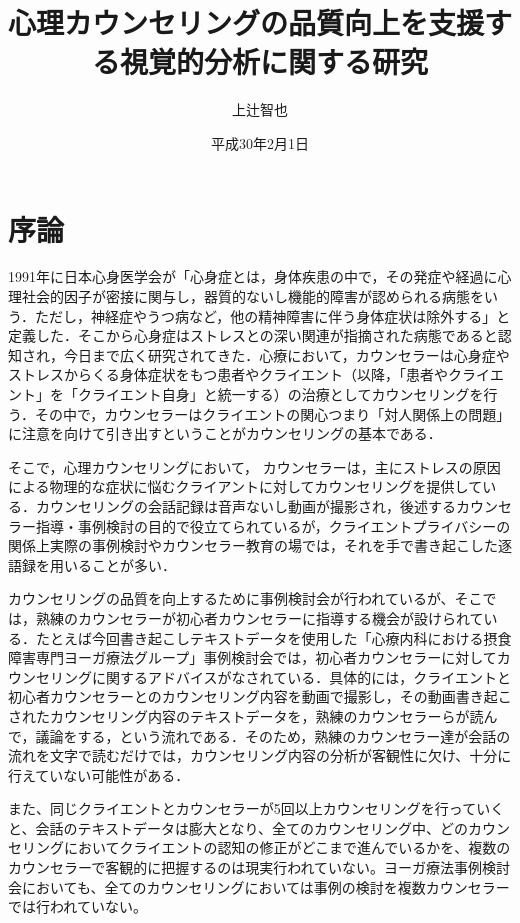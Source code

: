 \documentclass[shuuron]{kuee}
\title{心理カウンセリングの品質向上を支援する視覚的分析に関する研究}
\author{上辻智也}
\date{平成30年2月1日}
\begin{document}
\maketitle
\tableofcontents


\chapter{序論}



1991年に日本心身医学会が「心身症とは，身体疾患の中で，その発症や経過に心理社会的因子が密接に関与し，器質的ないし機能的障害が認められる病態をいう．ただし，神経症やうつ病など，他の精神障害に伴う身体症状は除外する」と定義した\cite{shinshinigaku}．そこから心身症はストレスとの深い関連が指摘された病態であると認知され，今日まで広く研究されてきた．心療において，カウンセラーは心身症やストレスからくる身体症状をもつ患者やクライエント（以降，「患者やクライエント」を「クライエント自身」と統一する）の治療としてカウンセリングを行う．その中で，カウンセラーはクライエントの関心つまり「対人関係上の問題」に注意を向けて引き出すということがカウンセリングの基本である\cite{zokad}．

そこで，心理カウンセリングにおいて， カウンセラーは，主にストレスの原因による物理的な症状に悩むクライアントに対してカウンセリングを提供している．カウンセリングの会話記録は音声ないし動画が撮影され，後述するカウンセラー指導・事例検討の目的で役立てられているが，クライエントプライバシーの関係上実際の事例検討やカウンセラー教育の場では，それを手で書き起こした逐語録を用いることが多い．






カウンセリングの品質を向上するために事例検討会が行われているが、そこでは，熟練のカウンセラーが初心者カウンセラーに指導する機会が設けられている．たとえば今回書き起こしテキストデータを使用した「心療内科における摂食障害専門ヨーガ療法グループ」事例検討会では，初心者カウンセラーに対してカウンセリングに関するアドバイスがなされている．具体的には，クライエントと初心者カウンセラーとのカウンセリング内容を動画で撮影し，その動画書き起こされたカウンセリング内容のテキストデータを，熟練のカウンセラーらが読んで，議論をする，という流れである．そのため，熟練のカウンセラー達が会話の流れを文字で読むだけでは，カウンセリング内容の分析が客観性に欠け、十分に行えていない可能性がある．


また、同じクライエントとカウンセラーが5回以上カウンセリングを行っていくと、会話のテキストデータは膨大となり、全てのカウンセリング中、どのカウンセリングにおいてクライエントの認知の修正がどこまで進んでいるかを、複数のカウンセラーで客観的に把握するのは現実行われていない。ヨーガ療法事例検討会においても、全てのカウンセリングにおいては事例の検討を複数カウンセラーでは行われていない。
\end{document}
